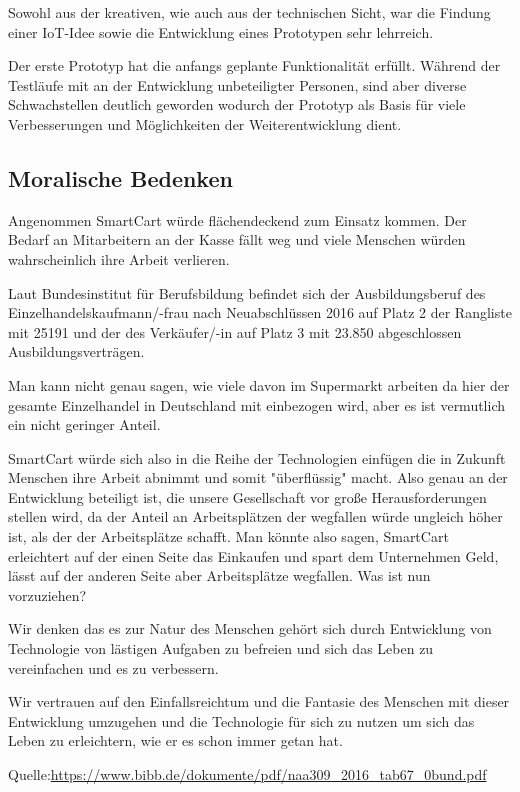 \documentclass{sigchi}
\begin{document}
Sowohl aus der kreativen, wie auch aus der technischen Sicht, war die Findung einer IoT-Idee sowie die Entwicklung eines Prototypen sehr lehrreich.

Der erste Prototyp hat die anfangs geplante Funktionalität erfüllt. Während der Testläufe mit an der Entwicklung unbeteiligter Personen, sind aber diverse Schwachstellen deutlich geworden wodurch der Prototyp als Basis für viele Verbesserungen und Möglichkeiten der Weiterentwicklung dient.


\subsection{Moralische Bedenken}
Angenommen SmartCart würde flächendeckend zum Einsatz kommen. 
Der Bedarf an Mitarbeitern an der Kasse fällt weg und viele Menschen würden wahrscheinlich ihre Arbeit verlieren. 

Laut Bundesinstitut für Berufsbildung befindet sich der Ausbildungsberuf des Einzelhandelskaufmann/-frau nach Neuabschlüssen 2016 auf Platz 2 der Rangliste mit 25191 und der des Verkäufer/-in auf Platz 3 mit 23.850 abgeschlossen Ausbildungsverträgen. 

Man kann nicht genau sagen, wie viele davon im Supermarkt arbeiten da hier der gesamte Einzelhandel in Deutschland mit einbezogen wird, aber es ist vermutlich ein nicht geringer Anteil. 

SmartCart würde sich also in die Reihe der Technologien einfügen die in Zukunft Menschen ihre Arbeit abnimmt und somit "überflüssig" macht. Also genau an der Entwicklung beteiligt ist, die unsere Gesellschaft vor große Herausforderungen stellen wird, da der Anteil an Arbeitsplätzen der wegfallen würde ungleich höher ist, als der der Arbeitsplätze schafft. Man könnte also sagen, SmartCart erleichtert auf der einen Seite das Einkaufen und spart dem Unternehmen Geld, lässt auf der anderen Seite aber Arbeitsplätze wegfallen. Was ist nun vorzuziehen? 

Wir denken das es zur Natur des Menschen gehört sich durch Entwicklung von Technologie von lästigen Aufgaben zu befreien und sich das Leben zu vereinfachen und es zu verbessern. 

Wir vertrauen auf den Einfallsreichtum und die Fantasie des Menschen mit dieser Entwicklung umzugehen und die Technologie für sich zu nutzen um sich das Leben zu erleichtern, wie er es schon immer getan hat.  
  
Quelle:\url{https://www.bibb.de/dokumente/pdf/naa309_2016_tab67_0bund.pdf}



\balance{}


%
\end{document}
